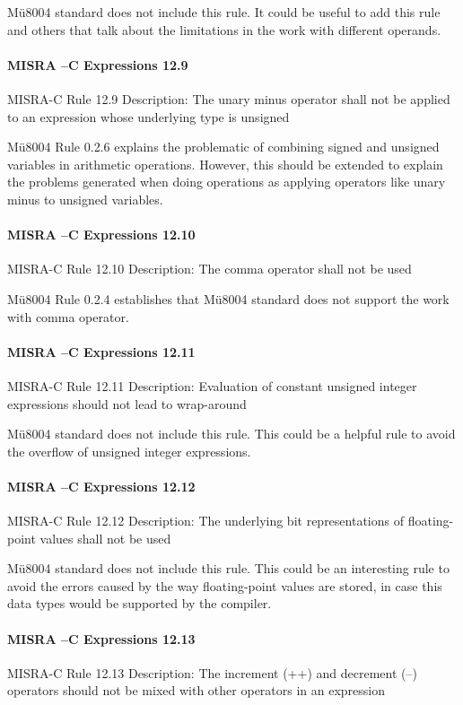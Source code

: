 Mü8004 standard does not include this rule. It could be useful to add this rule and others that talk about the limitations in the work with different operands.

\paragraph{MISRA –C Expressions 12.9}
MISRA-C Rule 12.9 Description: The unary minus operator shall not be applied to an expression whose underlying type is unsigned

Mü8004 Rule 0.2.6 explains the problematic of combining signed and unsigned variables in arithmetic operations. However, this should be extended to explain the problems generated when doing operations as applying operators like unary minus to unsigned variables.

\paragraph{MISRA –C Expressions 12.10}
MISRA-C Rule 12.10 Description: The comma operator shall not be used

Mü8004 Rule 0.2.4 establishes that Mü8004 standard does not support the work with comma operator. 

\paragraph{MISRA –C Expressions 12.11}
MISRA-C Rule 12.11 Description: Evaluation of constant unsigned integer expressions should not lead to wrap-around

Mü8004 standard does not include this rule. This could be a helpful rule to avoid the overflow of unsigned integer expressions.

\paragraph{MISRA –C Expressions 12.12}
MISRA-C Rule 12.12 Description: The underlying bit representations of floating-point values shall not be used

Mü8004 standard does not include this rule. This could be an interesting rule to avoid the errors caused by the way floating-point values are stored, in case this data types would be supported by the compiler.

\paragraph{MISRA –C Expressions 12.13}
MISRA-C Rule 12.13 Description: The increment (++) and decrement (--) operators should not be mixed with other operators in an expression

